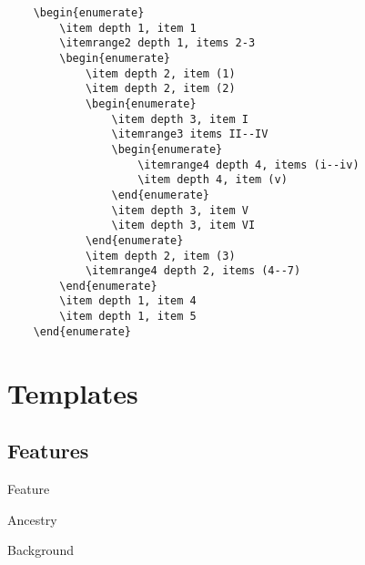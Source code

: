 \documentclass[itdr]{subfiles}
\begin{document}
\vfill

\begin{lstlisting}
	\begin{enumerate}
		\item depth 1, item 1
		\itemrange2 depth 1, items 2-3
		\begin{enumerate}
			\item depth 2, item (1)
			\item depth 2, item (2)
			\begin{enumerate}
				\item depth 3, item I
				\itemrange3 items II--IV
				\begin{enumerate}
					\itemrange4 depth 4, items (i--iv)
					\item depth 4, item (v)
				\end{enumerate}
				\item depth 3, item V
				\item depth 3, item VI
			\end{enumerate}
			\item depth 2, item (3)
			\itemrange4 depth 2, items (4--7)
		\end{enumerate}
		\item depth 1, item 4
		\item depth 1, item 5
	\end{enumerate}
\end{lstlisting}

\cleartoleftpage

\section{Templates}

\subsection{Features}

\noindent{} Feature

\noindent{} Ancestry

\noindent{} Background

\noindent{} 

\vspace{-1ex}
\end{document}
